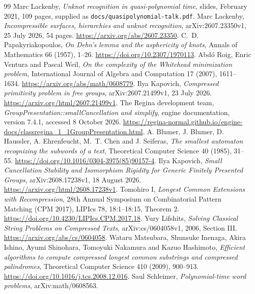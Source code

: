 \documentclass[11pt]{article}
\theoremstyle{remark}
\newcommand{\code}[1]{\texttt{#1}}
\begin{document}
\begin{thebibliography}{99}
 Marc Lackenby, \emph{Unknot recognition in quasi-polynomial time}, slides, February 2021, 109 pages, supplied as \code{docs/quasipolynomial-talk.pdf}.
 Marc Lackenby, \emph{Incompressible surfaces, hierarchies and unknot recognition}, arXiv:2607.23350v1, 25 July 2026, 54 pages. \url{https://arxiv.org/abs/2607.23350}.
 C.~D. Papakyriakopoulos,
\emph{On Dehn's lemma and the asphericity of knots},
Annals of Mathematics 66 (1957), 1--26.
\url{https://doi.org/10.2307/1970113}.
 Abd\'o Roig, Enric Ventura and Pascal Weil,
\emph{On the complexity of the Whitehead minimization problem},
International Journal of Algebra and Computation 17 (2007), 1611--1634.
\url{https://arxiv.org/abs/math/0608779}.
 Ilya Kapovich,
\emph{Compressed primitivity problem in free groups},
arXiv:2607.21499v1, 23 July 2026.
\url{https://arxiv.org/html/2607.21499v1}.
 The Regina development team,
\emph{GroupPresentation::smallCancellation and simplify}, engine documentation,
version 7.4.1, accessed 8 October 2026.
\url{https://regina-normal.github.io/engine-docs/classregina_1_1GroupPresentation.html}.
 A. Blumer, J. Blumer, D. Haussler, A. Ehrenfeucht,
M.~T. Chen and J. Seiferas,
\emph{The smallest automaton recognizing the subwords of a text},
Theoretical Computer Science 40 (1985), 31--55.
\url{https://doi.org/10.1016/0304-3975(85)90157-4}.
 Ilya Kapovich,
\emph{Small Cancellation Stability and Isomorphism Rigidity for Generic Finitely Presented Groups},
arXiv:2608.17238v1, 18 August 2026.
\url{https://arxiv.org/html/2608.17238v1}.
 Tomohiro I,
\emph{Longest Common Extensions with Recompression},
28th Annual Symposium on Combinatorial Pattern Matching (CPM 2017),
LIPIcs 78, 18:1--18:15, Theorem 2.
\url{https://doi.org/10.4230/LIPIcs.CPM.2017.18}.
 Yury Lifshits,
\emph{Solving Classical String Problems on Compressed Texts},
arXiv:cs/0604058v1, 2006, Section III.
\url{https://arxiv.org/abs/cs/0604058}.
 Wataru Matsubara, Shunsuke Inenaga,
Akira Ishino, Ayumi Shinohara, Tomoyuki Nakamura and Kazuo Hashimoto,
\emph{Efficient algorithms to compute compressed longest common substrings
and compressed palindromes}, Theoretical Computer Science 410 (2009), 900--913.
\url{https://doi.org/10.1016/j.tcs.2008.12.016}.
 Saul Schleimer,
\emph{Polynomial-time word problems}, arXiv:math/0608563.

\end{thebibliography}
\end{document}
